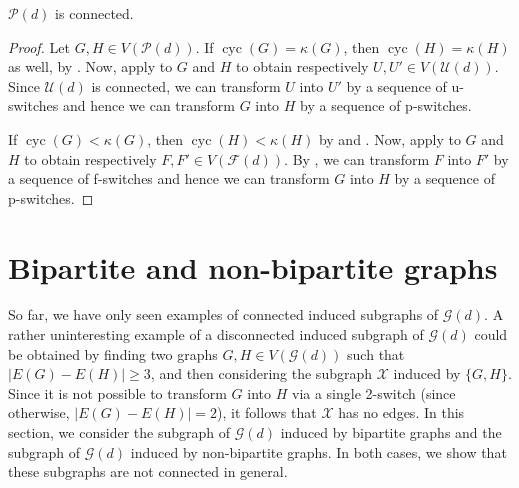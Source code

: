 \documentclass{BICA}
\newcommand{\cycles}{\operatorname{cyc}}
\begin{document}
\begin{theorem}
	\label{pseudoTransition}

	$\mathcal{P}(d)$ is connected.
\end{theorem}

\begin{proof}
	Let $G,H\in V(\mathcal{P}(d))$. If $\cycles(G)=\kappa(G)$, then $\cycles(H)=\kappa(H)$ as well, by . Now, apply  to $G$ and $H$ to obtain respectively $U,U'\in V(\mathcal{U}(d))$. Since $\mathcal{U}(d)$ is connected, we can transform $U$ into $U'$ by a sequence of u-switches and hence we can transform $G$ into $H$ by a sequence of p-switches.

    If $\cycles(G)<\kappa(G)$, then  $\cycles(H)<\kappa(H)$ by  and . Now, apply  to $G$ and $H$ to obtain respectively $F,F'\in V(\mathcal{F}(d))$. By , we can transform $F$ into $F'$ by a sequence of f-switches and hence we can transform $G$ into $H$ by a sequence of p-switches.
\end{proof}

\section{Bipartite and non-bipartite graphs}\label{sec_bipartite_nonbip}

So far, we have only seen examples of connected induced subgraphs of $\mathcal{G}(d)$. A rather uninteresting example of a disconnected induced subgraph of $\mathcal{G}(d)$ could be obtained by finding two graphs $G,H \in V(\mathcal{G}(d))$ such that $|E(G)-E(H)| \geq 3$, and then considering the subgraph $\mathcal{X}$ induced by $\{G,H\}$. Since it is not possible to transform $G$ into $H$ via a single 2-switch (since otherwise, $|E(G)-E(H)|=2$), it follows that $\mathcal{X}$ has no edges. In this section, we consider the subgraph of $\mathcal{G}(d)$ induced by bipartite graphs and the subgraph of $\mathcal{G}(d)$ induced by non-bipartite graphs. In both cases, we show that these subgraphs are not connected in general.\\
\end{document}
